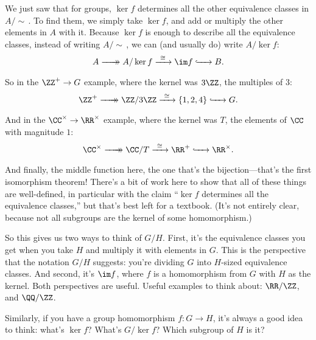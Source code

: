 \documentclass[11pt,paper=letter]{scrartcl}
\newcommand{\xrightarrowdbl}[2][]{%
  \xrightarrow[#1]{#2}\mathrel{\mkern-14mu}\rightarrow
}
\newcommand{\simm}{\!\sim\,}
\begin{document}
We just saw that for groups, $\ker f$ determines all the other equivalence classes in $A/\simm$. To find them, we simply take $\ker f$, and add or multiply the other elements in $A$ with it. Because $\ker f$ is enough to describe all the equivalence classes, instead of writing $A/\simm$, we can (and usually do) write $A/\ker f$:
\[
A \xrightarrowdbl{\phantom{xxx}} A/\ker f
\xrightarrow[\phantom{xxx}]{\cong} \im f
\xhookrightarrow{\phantom{xxx}} B.
\]
So in the $\ZZ^+ \to G$ example, where the kernel was $3\ZZ$, the multiples of $3$:
\[
\ZZ^+ \xrightarrowdbl{\phantom{xxx}} \ZZ/3\ZZ
\xrightarrow[\phantom{xxx}]{\cong} \{1, 2, 4\}
\xhookrightarrow{\phantom{xxx}} G.
\]
And in the $\CC^\times \to \RR^\times$ example, where the kernel was $T$, the elements of $\CC$ with magnitude $1$:
\[
\CC^\times \xrightarrowdbl{\phantom{xxx}} \CC/T
\xrightarrow[\phantom{xxx}]{\cong} \RR^+
\xhookrightarrow{\phantom{xxx}} \RR^\times.
\]
And finally, the middle function here, the one that's the bijection---that's the first isomorphism theorem! There's a bit of work here to show that all of these things are well-defined, in particular with the claim ``$\ker f$ determines all the equivalence classes,'' but that's best left for a textbook. (It's not entirely clear, because not all subgroups are the kernel of some homomorphism.)

So this gives us two ways to think of $G/H$. First, it's the equivalence classes you get when you take $H$ and multiply it with elements in $G$. This is the perspective that the notation $G/H$ suggests: you're dividing $G$ into $H$-sized equivalence classes. And second, it's $\im f$, where $f$ is a homomorphism from $G$ with $H$ as the kernel. Both perspectives are useful. Useful examples to think about: $\RR/\ZZ$, and $\QQ/\ZZ$.

Similarly, if you have a group homomorphism $f : G \to H$, it's always a good idea to think: what's $\ker f$? What's $G/\ker f$? Which subgroup of $H$ is it?
\end{document}
